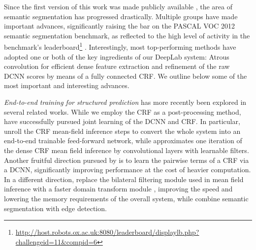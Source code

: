 \documentclass[10pt,journal,compsoc]{IEEEtran}
\begin{document}
Since the first version of this work was made publicly available
\cite{chen2014semantic}, the area of semantic segmentation has progressed
drastically. Multiple groups have made important advances, significantly raising
the bar on the PASCAL VOC 2012 semantic segmentation benchmark, as reflected to
the high level of activity in the benchmark's
leaderboard\footnote{\url{http://host.robots.ox.ac.uk:8080/leaderboard/displaylb.php?challengeid=11&compid=6}}
\cite{papandreou2015weakly, zheng2015conditional, dai2015boxsup, noh2015learning,
liu2015semantic, lin2015efficient, chen2015attention, chen2015semantic}.
Interestingly, most top-performing methods have adopted one or both of the key
ingredients of our DeepLab system: Atrous convolution for efficient dense
feature extraction and refinement of the raw DCNN scores by means of a fully
connected CRF. We outline below some of the most important and interesting advances.

\newcommand{\mycomment}[1]{}
\mycomment{
	A key difference compared to \cite{long2014fully} lies in the way we produce
	feature maps at the original image resolution: They use a sequence of
	deconvolutional layers \cite{zeiler2014visualizing}, while we use a combination
	of atrous convolution and bilinear interpolation, resulting in a significantly
	simpler system that explicitly handles the signal downsampling issue, requires
	fewer parameters, and is easier to train.
}


\emph{End-to-end training for structured prediction} has  more recently 
been explored in several related works. 
While we employ the CRF as a post-processing method,
\cite{zheng2015conditional, chen2014learning, schwing2015fully, liu2015semantic,
lin2015efficient} have successfully pursued joint learning of the DCNN and CRF.
In particular, \cite{zheng2015conditional, schwing2015fully} unroll the CRF
mean-field inference steps to convert the whole system into an end-to-end
trainable feed-forward network, while \cite{liu2015semantic} approximates one
iteration of the dense CRF mean field inference \cite{krahenbuhl2011efficient}
by convolutional layers with learnable filters. Another fruitful direction
pursued by \cite{lin2015efficient,chandra2016fast} is to learn the pairwise terms of a CRF
via a DCNN, significantly improving performance at the cost of heavier
computation. In a different direction, \cite{chen2015semantic} replace the
bilateral filtering module used in mean field inference with a faster
domain transform module \cite{GastalOliveira2011DomainTransform}, improving the speed and lowering the
memory requirements of the overall system, while
\cite{bertasius2015high, kokkinos2016pushing} combine semantic segmentation
with edge detection.
\end{document}
